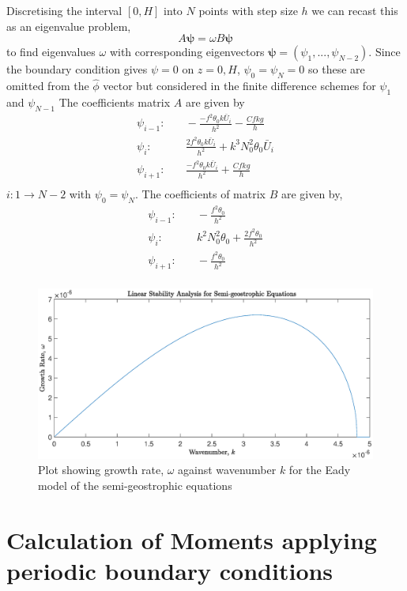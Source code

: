 Discretising the interval $[0,H]$ into $N$ points with step size $h$ we can recast this as an eigenvalue problem,
\begin{equation*}
	A\bm{\psi} = \omega B\bm{\psi}
\end{equation*}
to find eigenvalues $\omega$ with corresponding eigenvectors $\bm{\psi} = \left(\psi_1, ... , \psi_{N-2}\right)$. Since the boundary condition gives $\psi = 0$ on $z = 0, H$, $\psi_0 = \psi_N = 0$ so these are omitted from the $\hat{\phi}$ vector but considered in the finite difference schemes for $\psi_1$ and $\psi_{N-1}$
The coefficients matrix $A$ are given by
\begin{equation}
	\begin{aligned}
		\psi_{i-1}:& \quad -\frac{-f^2\theta_0k\bar{U}_i}{h^2} - \frac{Cfkg}{h}\\
		\psi_i:& \quad \frac{2f^2\theta_0k\bar{U}_i}{h^2} + k^3N_0^2\theta_0\bar{U}_i\\
		\psi_{i+1}:& \quad \frac{-f^2\theta_0k\bar{U}_i}{h^2} + \frac{Cfkg}{h}\\
	\end{aligned}
\end{equation}
$i: 1 \rightarrow N-2$ with $\psi_0 = \psi_{N}$. The coefficients of matrix $B$ are given by,
\begin{equation*}
	\begin{aligned}
		\psi_{i-1}:& \quad -\frac{f^2\theta_0}{h^2}\\
		\psi_i:& \quad k^2N_0^2\theta_0 + \frac{2f^2\theta_0}{h^2}\\
		\psi_{i+1}:& \quad -\frac{f^2\theta_0}{h^2}\\
	\end{aligned}
\end{equation*}
\begin{figure}[h]
	\centering
	\includegraphics[width=\linewidth]{project/Linear_stability_analysis}
	\caption[Linear stability analysis results for the semi-geostrophic equations]{Plot showing growth rate, $\omega$ against wavenumber $k$ for the Eady model of the semi-geostrophic equations}
	\label{fig:linearstabilityanalysis}
\end{figure}
\section{Calculation of Moments applying periodic boundary conditions}